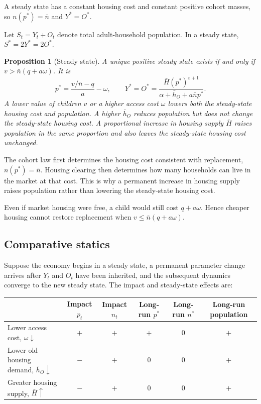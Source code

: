 \documentclass[11pt]{article}
\newtheorem{proposition}{Proposition}
\theoremstyle{definition}
\newcommand{\1}{\mathbf 1}
\begin{document}
A steady state has a constant housing cost and constant positive cohort
masses, so $n(p^*)=\bar n$ and $Y^*=O^*$.

Let $S_t=Y_t+O_t$ denote total adult-household population. In a steady state,
$S^*=2Y^*=2O^*$.

\begin{proposition}[Steady state]
\label{prop:toy_ss}
A unique positive steady state exists if and only if
$v>\bar n(q+a\omega)$. It is
\begin{equation}
 p^*=\frac{v/\bar n-q}{a}-\omega,
 \qquad
 Y^*=O^*=\frac{\bar H(p^*)^{\varepsilon+1}}
 {\alpha+\bar h_O+a\bar n p^*}.
 \label{eq:toy_ss}
\end{equation}
A lower value of children $v$ or a higher access cost $\omega$ lowers both
the steady-state housing cost and population. A higher $\bar h_O$ reduces
population but does not change the steady-state housing cost. A proportional
increase in housing supply $\bar H$ raises population in the same proportion
and also leaves the steady-state housing cost unchanged.
\end{proposition}

The cohort law first determines the housing cost consistent with replacement,
$n(p^*)=\bar n$. Housing clearing then determines how many households can live
in the market at that cost. This is why a permanent increase in housing supply
raises population rather than lowering the steady-state housing cost.

Even if market housing were free, a child would still cost $q+a\omega$. Hence
cheaper housing cannot restore replacement when
$v\leq\bar n(q+a\omega)$.

\subsection{Comparative statics}
\label{cor:demographic_capitalization}

Suppose the economy begins in a steady state, a permanent parameter change
arrives after $Y_t$ and $O_t$ have been inherited, and the subsequent dynamics
converge to the new steady state. The impact and steady-state effects are:
\begin{center}
\small
\setlength{\tabcolsep}{4pt}
\begin{tabular}{lccccc}
\toprule
 & Impact $p_t$ & Impact $n_t$ & Long-run $p^*$
 & Long-run $n^*$ & Long-run population \\
\midrule
Lower access cost, $\omega\downarrow$ & $+$ & $+$ & $+$ & $0$ & $+$ \\
Lower old housing demand, $\bar h_O\downarrow$ & $-$ & $+$ & $0$ & $0$ & $+$ \\
Greater housing supply, $\bar H\uparrow$ & $-$ & $+$ & $0$ & $0$ & $+$ \\
\bottomrule
\end{tabular}
\end{center}
\end{document}
